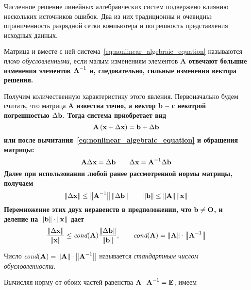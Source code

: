 \documentclass[../../calc-math-exam-2023.tex]{subfiles}
\begin{document}
    Численное решение линейных алгебраических систем подвержено влиянию нескольких источников ошибок.
    Два из них традиционны и очевидны: ограниченность разрядной сетки компьютера и погрешность представления
    исходных данных.
    \begin{definition}
        Матрица и вместе с ней система~\eqref{eq:nonlinear_algebraic_equation} называются
        \emph{плохо обусловленными}, если малым изменениям элементов \bf{A} отвечают большие
        изменения элементов $\bf{A}^{-1}$ и, следовательно, сильные изменения вектора решения.
    \end{definition}
    Получим количественную характеристику этого явления. Первоначально будем считать, что
    матрица \bf{A} известна точно, а вектор \bf{b} -- с некотрой погрешностью $\Delta \bf{b}$.
    Тогда система приобретает вид
    \begin{equation*}
        \bf{A}\left( \bf{x} + \Delta \bf{x} \right) = \bf{b} + \Delta \bf{b}
    \end{equation*}
    или после вычитания~\eqref{eq:nonlinear_algebraic_equation} и обращения матрицы:
    \begin{equation*}
        \bf{A}\Delta\bf{x} = \Delta \bf{b} \qquad \Delta \bf{x} = \bf{A}^{-1}\Delta \bf{b}
    \end{equation*}
    Далее при использовании любой ранее рассмотренной нормы матрицы, получаем
    \begin{equation*}
        \left\| \Delta \bf{x} \right\| \leq \left\| \bf{A}^{-1} \right\| \left\| \Delta \bf{b} \right\| \qquad \left\| \bf{b} \right\| \leq \left\| \bf{A} \right\| \left\| \bf{x} \right\|
    \end{equation*}
    Перемножение этих двух неравенств в предположении, что $\bf{b} \neq \bf{O}$, и деление на $\left\| \bf{b} \right\| \cdot \left\| \bf{x} \right\|$ дает
    \begin{equation}
        \frac{\left\| \Delta \bf{x} \right\|}{\left\| \bf{x} \right\|} \leq \textit{cond}(\bf{A})\frac{\left\| \Delta \bf{b} \right\|}{\left\| \bf{b} \right\|},
        \qquad \textit{cond}(\bf{A}) = \left\| \bf{A} \right\| \cdot \left\| \bf{A}^{-1} \right\| \label{eq:matrix_condition}
    \end{equation}
    \begin{definition}
        Число $\displaystyle \textit{cond}(\bf{A}) = \left\| \bf{A} \right\| \cdot \left\| \bf{A}^{-1} \right\|$ называется
        \emph{стандартным числом обусловленности}.
    \end{definition}
    Вычисляя норму от обоих частей равенства $\displaystyle \bf{A} \cdot \bf{A}^{-1} = \bf{E}$, имеем
\end{document}
